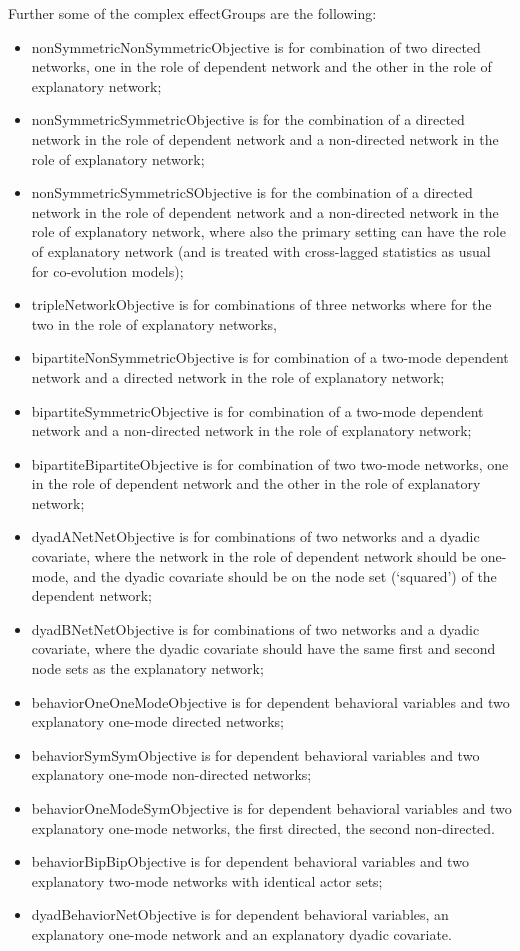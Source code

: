 \documentclass[a4paper,fleqn,11pt]{article}
\newcommand{\+}{\, + \,}
\newcommand{\sfn}[1]{\textsf{#1}}
\begin{document}
Further some of the complex effectGroups are the following:
\begin{itemize}
\item \sfn{nonSymmetricNonSymmetricObjective} is for combination of two
    directed networks, one in the role of dependent network and the other
    in the role of explanatory network;
\item \sfn{nonSymmetricSymmetricObjective} is for the combination of a
    directed network in the role of dependent network and a non-directed network
    in the role of explanatory network;
\item \sfn{nonSymmetricSymmetricSObjective} is for the combination of a
    directed network in the role of dependent network and a non-directed network
    in the role of explanatory network, where also the primary setting
    can have the role of explanatory network (and is treated with cross-lagged
    statistics as usual for co-evolution models);
\item \sfn{tripleNetworkObjective} is for combinations
    of three networks where for the two in the role of explanatory networks,
\item \sfn{bipartiteNonSymmetricObjective} is for combination of
    a two-mode dependent network and a directed network
    in the role of explanatory network;
\item \sfn{bipartiteSymmetricObjective} is for combination of
    a two-mode dependent network and a non-directed network
    in the role of explanatory network;
\item \sfn{bipartiteBipartiteObjective} is for combination of two
    two-mode networks, one in the role of dependent network and the other
    in the role of explanatory network;
\item \sfn{dyadANetNetObjective} is for combinations
    of two networks and a dyadic covariate, where the network in the role
    of dependent network should be one-mode, and the dyadic covariate
    should be on the node set (`squared') of the dependent network;
\item \sfn{dyadBNetNetObjective} is for combinations
    of two networks and a dyadic covariate, where the dyadic covariate
    should have the same first and second node sets
    as the explanatory network;
\item \sfn{behaviorOneOneModeObjective} is for dependent behavioral variables and
    two explanatory one-mode directed networks;
\item \sfn{behaviorSymSymObjective} is for dependent behavioral variables and
    two explanatory one-mode non-directed networks;
\item \sfn{behaviorOneModeSymObjective} is for dependent behavioral variables and
    two explanatory one-mode networks, the first directed, the second non-directed.
\item \sfn{behaviorBipBipObjective} is for dependent behavioral variables and
    two explanatory two-mode networks with identical actor sets;
\item \sfn{dyadBehaviorNetObjective} is for dependent behavioral variables,
   an explanatory one-mode network and an explanatory dyadic covariate.
\end{itemize}
\end{document}
